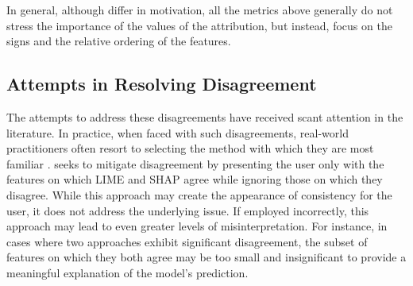 In general, although differ in motivation, all the metrics above generally do not stress the importance of the values of the attribution, but instead, focus on the signs and the relative ordering of the features.

\subsection{Attempts in Resolving Disagreement}
\label{subsec:attemptsInResolvingDisagreement}
The attempts to address these disagreements have received scant attention in the literature. In practice, when faced with such disagreements, real-world practitioners often resort to selecting the method with which they are most familiar \cite{krishna_disagreement_problem}. \cite{whyDontXAITechniquesAgree} seeks to mitigate disagreement by presenting the user only with the features on which LIME and SHAP agree while ignoring those on which they disagree. While this approach may create the appearance of consistency for the user, it does not address the underlying issue. If employed incorrectly, this approach may lead to even greater levels of misinterpretation. For instance, in cases where two approaches exhibit significant disagreement, the subset of features on which they both agree may be too small and insignificant to provide a meaningful explanation of the model's prediction.